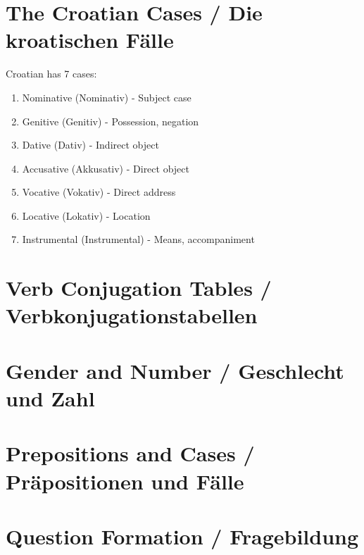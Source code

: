 
\section{The Croatian Cases / Die kroatischen Fälle}

Croatian has 7 cases:
\begin{enumerate}
    \item Nominative (Nominativ) - Subject case
    \item Genitive (Genitiv) - Possession, negation
    \item Dative (Dativ) - Indirect object
    \item Accusative (Akkusativ) - Direct object
    \item Vocative (Vokativ) - Direct address
    \item Locative (Lokativ) - Location
    \item Instrumental (Instrumental) - Means, accompaniment
\end{enumerate}

\section{Verb Conjugation Tables / Verbkonjugationstabellen}


\section{Gender and Number / Geschlecht und Zahl}


\section{Prepositions and Cases / Präpositionen und Fälle}


\section{Question Formation / Fragebildung}

